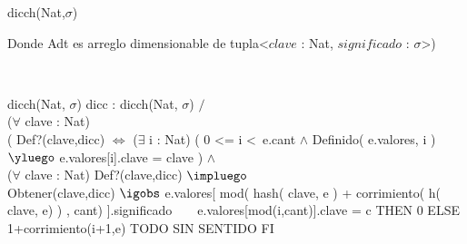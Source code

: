\begin{Representacion}

	
	\begin{Estructura}{dicch(Nat,$\sigma$)}
		\begin{Tupla}
		\end{Tupla}
		Donde Adt es arreglo dimensionable de tupla<$clave$ : Nat, $significado$ : $\sigma$>)
	\end{Estructura}
	
	
~
	
	\AbsFc
	{dicch(Nat, $\sigma$)}
	{dicc : dicch(Nat, $\sigma$) $/$ \\
		($\forall$ clave : Nat) \\
		( Def?(clave,dicc) $\Leftrightarrow$ ($\exists$ i : Nat)
		( 0 <= i <\ e.cant $\land$ Definido( e.valores, i ) $\yluego$ e.valores[i].clave = clave ) $\land$ \\	($\forall$ clave : Nat) Def?(clave,dicc) $\impluego$	\\ Obtener(clave,dicc) $\igobs$ 
		e.valores[ mod( hash( clave, e ) + corrimiento( h( clave, e) ) , cant) ].significado}
~
~											
	{\IF e.valores[mod(i,cant)].clave = c
		THEN 0
		ELSE 1+corrimiento(i+1,e) TODO SIN SENTIDO
	FI}		

\end{Representacion}

